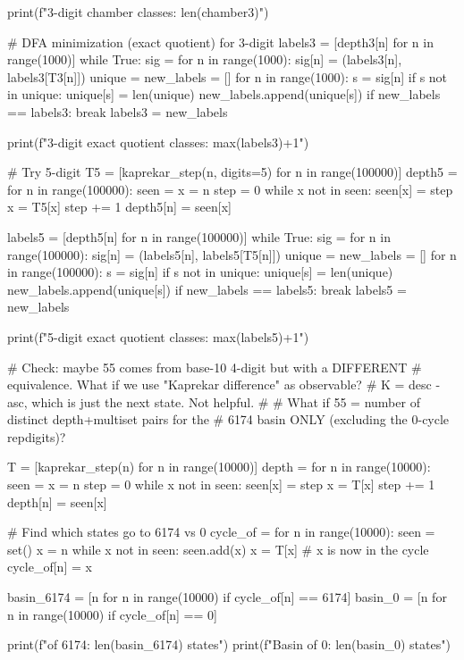 {{{{{{{{{{{{{print(f"3-digit chamber classes: {len(chamber3)}")

# DFA minimization (exact quotient) for 3-digit
labels3 = [depth3[n] for n in range(1000)]
while True:
    sig = {}
    for n in range(1000):
        sig[n] = (labels3[n], labels3[T3[n]])
    unique = {}
    new_labels = []
    for n in range(1000):
        s = sig[n]
        if s not in unique:
            unique[s] = len(unique)
        new_labels.append(unique[s])
    if new_labels == labels3:
        break
    labels3 = new_labels

print(f"3-digit exact quotient classes: {max(labels3)+1}")

# Try 5-digit
T5 = [kaprekar_step(n, digits=5) for n in range(100000)]
depth5 = {}
for n in range(100000):
    seen = {}
    x = n
    step = 0
    while x not in seen:
        seen[x] = step
        x = T5[x]
        step += 1
    depth5[n] = seen[x]

labels5 = [depth5[n] for n in range(100000)]
while True:
    sig = {}
    for n in range(100000):
        sig[n] = (labels5[n], labels5[T5[n]])
    unique = {}
    new_labels = []
    for n in range(100000):
        s = sig[n]
        if s not in unique:
            unique[s] = len(unique)
        new_labels.append(unique[s])
    if new_labels == labels5:
        break
    labels5 = new_labels

print(f"5-digit exact quotient classes: {max(labels5)+1}")

# Check: maybe 55 comes from base-10 4-digit but with a DIFFERENT
# equivalence. What if we use "Kaprekar difference" as observable?
# K = desc - asc, which is just the next state. Not helpful.
#
# What if 55 = number of distinct depth+multiset pairs for the
# 6174 basin ONLY (excluding the 0-cycle repdigits)?

T = [kaprekar_step(n) for n in range(10000)]
depth = {}
for n in range(10000):
    seen = {}
    x = n
    step = 0
    while x not in seen:
        seen[x] = step
        x = T[x]
        step += 1
    depth[n] = seen[x]

# Find which states go to 6174 vs 0
cycle_of = {}
for n in range(10000):
    seen = set()
    x = n
    while x not in seen:
        seen.add(x)
        x = T[x]
    # x is now in the cycle
    cycle_of[n] = x

basin_6174 = [n for n in range(10000) if cycle_of[n] == 6174]
basin_0 = [n for n in range(10000) if cycle_of[n] == 0]

print(f"\nBasin of 6174: {len(basin_6174)} states")
print(f"Basin of 0: {len(basin_0)} states")

}}}}}}}}}}}}}
